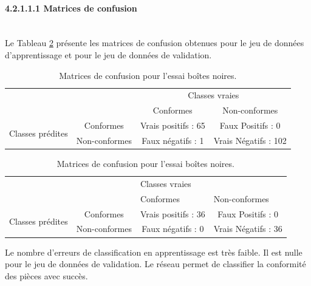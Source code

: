 \paragraph{4.2.1.1.1 Matrices de confusion} \mbox{} \\
Le Tableau \ref{tab:box_results} présente les matrices de confusion obtenues pour le jeu de données d'apprentissage et pour le jeu de données de validation.
\begin{table}[!h]
	\centering
	\begin{subtable}{1\textwidth}
		\centering
		\begin{tabular}{c c|c|c|}
			\cline{3-4}
			& & \multicolumn{2}{c|}{Classes vraies}               \\ \cline{3-4}
			& & \multicolumn{1}{c|}{Conformes} & \multicolumn{1}{c|}{Non-conformes} \\ \hline
			\multicolumn{1}{|c|}{\multirow{2}{*}{Classes prédites}} & Conformes & Vrais positifs : 65 & Faux Positifs : 0 \\ \cline{2-4} 
			\multicolumn{1}{|c|}{} & Non-conformes & Faux négatifs : 1  & Vrais Négatifs : 102 \\ \hline
		\end{tabular}
		\caption{Jeu de données d'apprentissage.}
	\end{subtable}

	\bigskip

	\begin{subtable}{1\textwidth}
		\centering
		\begin{tabular}{l c|c|c|}
			\cline{3-4}
			& & \multicolumn{2}{l|}{Classes vraies}               \\ \cline{3-4}
			& & \multicolumn{1}{l|}{Conformes} & \multicolumn{1}{l|}{Non-conformes} \\ \hline
			\multicolumn{1}{|l|}{\multirow{2}{*}{Classes prédites}} & Conformes & Vrais positifs : 36 & Faux Positifs : 0 \\ \cline{2-4} 
			\multicolumn{1}{|l|}{} & Non-conformes & Faux négatifs : 0  & Vrais Négatifs : 36 \\ \hline
		\end{tabular}
		\caption{Jeu de données de validation.}
	\end{subtable}
	\caption{Matrices de confusion pour l'essai boîtes noires.}
	\label{tab:box_results}
\end{table}

Le nombre d'erreurs de classification en apprentissage est très faible.
Il est nulle pour le jeu de données de validation.
Le réseau permet de classifier la conformité des pièces avec succès.

